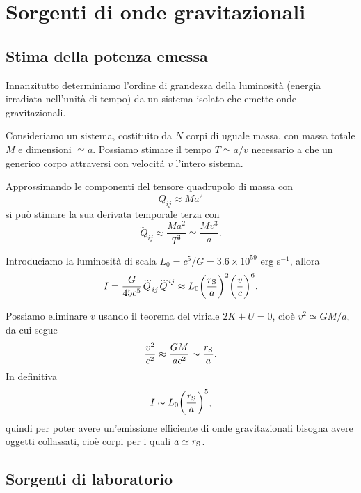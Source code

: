\section{Sorgenti di onde gravitazionali}
\label{sec:sorgenti-onde-grav}


\subsection{Stima della potenza emessa}
\label{sec:potenza-emessa}

Innanzitutto determiniamo l'ordine di grandezza della luminosità (energia
irradiata nell'unità di tempo) da un sistema isolato che emette onde
gravitazionali.

Consideriamo un sistema, costituito da $N$ corpi di uguale massa, con massa
totale $M$ e dimensioni $\simeq a$.  Possiamo stimare il tempo $T \simeq a/v$
necessario a che un generico corpo attraversi con velocit\'a $v$ l'intero
sistema.

Approssimando le componenti del tensore quadrupolo di massa con
\begin{equation}
  Q_{ij} \approx M a^{2}
\end{equation}
si può stimare la sua derivata temporale terza con
\begin{equation}
  \dddot{Q}_{ij} \approx \frac{M a^{2}}{T^{3}} \simeq \frac{Mv^{3}}{a}.
\end{equation}

Introduciamo la luminosità di scala $L_{0} = c^{5}/G = 3.6 \times 10^{59}$ erg
s$^{-1}$, allora
\begin{equation}
  I = \frac{G}{45c^{5}} \dddot{Q}_{ij} \dddot{Q}^{ij} \approx
  L_{0} \bigg(\frac{r_{\textup{S}}}{a}\bigg)^{2} \bigg(\frac{v}{c}\bigg)^{6}.
\end{equation}

Possiamo eliminare $v$ usando il teorema del viriale $2K + U = 0$, cioè $v^{2}
\simeq GM/a$, da cui segue
\begin{equation}
  \frac{v^{2}}{c^{2}} \approx \frac{GM}{ac^{2}} \sim   \frac{r_{\textup{S}}}{a}.
\end{equation}
In definitiva
\begin{equation}
  I \sim L_{0} \bigg(\frac{r_{\textup{S}}}{a}\bigg)^{5},
\end{equation}
quindi per poter avere un'emissione efficiente di onde gravitazionali bisogna
avere oggetti collassati, cioè corpi per i quali $a \simeq r_{\textup{S}}$.

\subsection{Sorgenti di laboratorio}
\label{sec:sorgenti-laboratorio}

